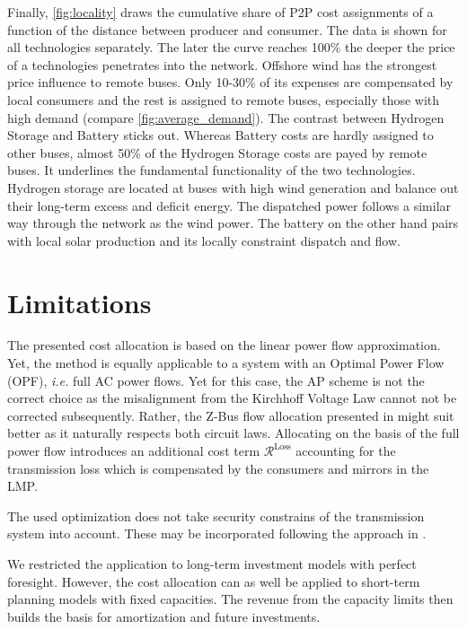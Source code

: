 \documentclass[11pt,twocolumn]{article}
\newcommand{\ie}{\textit{i.e.} }
\newcommand{\remainingcost}{\mathcal{R}}
\begin{document}
Finally, \cref{fig:locality} draws the cumulative share of P2P cost assignments of a function of the distance between producer and consumer. The data is shown for all technologies separately. The later the curve reaches 100\% the deeper the price of a technologies penetrates into the network. Offshore wind has the strongest price influence to remote buses. Only 10-30\% of its expenses are compensated by local consumers and the rest is assigned to remote buses, especially those with high demand (compare \cref{fig:average_demand}). The contrast between Hydrogen Storage and Battery sticks out. Whereas Battery costs are hardly assigned to other buses, almost 50\% of the Hydrogen Storage costs are payed by remote buses. It underlines the fundamental functionality of the two technologies. Hydrogen storage are located at buses with high wind generation and balance out their long-term excess and deficit energy. The dispatched power follows a similar way through the network as the wind power. The battery on the other hand pairs with local solar production and its locally constraint dispatch and flow.     

\section{Limitations}
The presented cost allocation is based on the linear power flow approximation. Yet, the method is equally applicable to a system with an Optimal Power Flow (OPF), \ie full AC power flows. Yet for this case, the AP scheme is not the correct choice as the misalignment from the Kirchhoff Voltage Law cannot not be corrected subsequently. Rather, the Z-Bus flow allocation presented in \cite{conejo_z-bus_2007} might suit better as it naturally respects both circuit laws. Allocating on the basis of the full power flow introduces an additional cost term $\remainingcost^\text{Loss}$ accounting for the transmission loss which is compensated by the consumers and mirrors in the LMP. 

The used optimization does not take security constrains of the transmission system into account. These may be incorporated following the approach in \cite{nikoukar_transmission_2012}. 

We restricted the application to long-term investment models with perfect foresight. However, the cost allocation can as well be applied to short-term planning models with fixed capacities. The revenue from the capacity limits then builds the basis for amortization and future investments.
\end{document}
